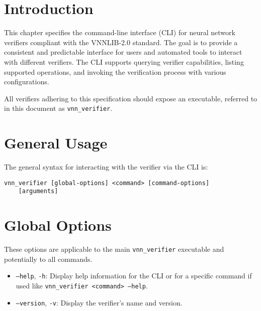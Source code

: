 

\section{Introduction}
This chapter specifies the command-line interface (CLI) for neural network verifiers compliant with the VNNLIB-2.0 standard. The goal is to provide a consistent and 
predictable interface for users and automated tools to interact with different verifiers. The CLI supports querying verifier capabilities, listing supported operations, 
and invoking the verification process with various configurations.

All verifiers adhering to this specification should expose an executable, referred to in this document as \texttt{vnn\_verifier}.

\section{General Usage}
The general syntax for interacting with the verifier via the CLI is:
\begin{lstlisting}[style=bash, numbers=none, frame=none, backgroundcolor=\color{white}]
vnn_verifier [global-options] <command> [command-options] 
	[arguments] \end{lstlisting}

\section{Global Options}
These options are applicable to the main \texttt{vnn\_verifier} executable and potentially to all commands.
\begin{itemize}
    \item \texttt{--help}, \texttt{-h}: Display help information for the CLI or for a specific command if used like \texttt{vnn\_verifier <command> --help}.
    \item \texttt{--version}, \texttt{-v}: Display the verifier's name and version.
\end{itemize}

